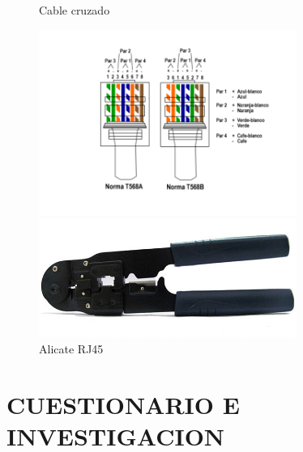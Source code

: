 \documentclass[onecolumn,12pt]{IEEEtran}
\begin{document}
\begin{figure}[h]
\caption{Cable cruzado}
\centering \includegraphics[width=0.75\textwidth]{Cruzado.png}
\caption{Alicate RJ45}
\centering \includegraphics[width=0.75\textwidth]{AlicateRJ45.jpg}
\end{figure}

\newpage
\section{CUESTIONARIO E INVESTIGACION}
\hfill \\
\end{document}
